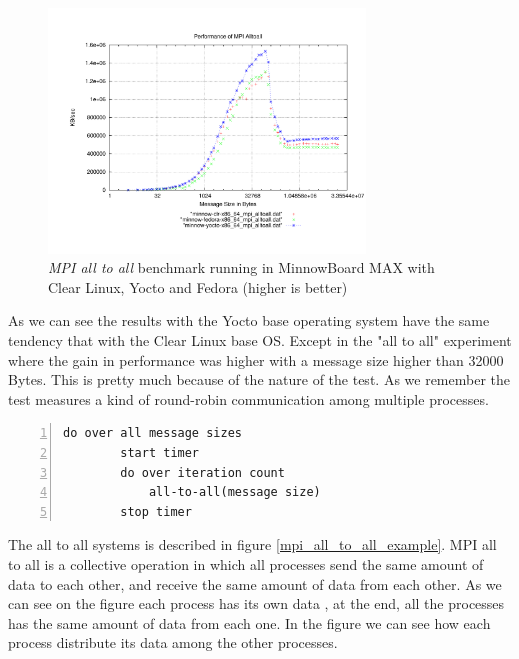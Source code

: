 \begin{figure}[H]
\centering
\includegraphics[width=0.75\textwidth]{images/mpbench_yocto_experiments/mpi_alltoall.pdf}
\caption{\textit{MPI all to all} benchmark running in  MinnowBoard MAX with Clear Linux, Yocto
and Fedora (higher is better)}
\label{mpi_all_to_all_yocto}
\end{figure}

As we can see the results with the Yocto base operating system have the same
tendency that with the Clear Linux base OS. Except in the "all to all"
experiment where the gain in performance was higher with a message size higher
than 32000 Bytes. This is pretty much because of the nature of the test. As we
remember the test measures a kind of round-robin communication among multiple
processes.

\begin{minipage}{\textwidth}
\end{minipage}

\begin{minipage}{\textwidth}
\begin{lstlisting}[frame=single,numbers=left]
    do over all message sizes 
        start timer
        do over iteration count 
            all-to-all(message size)
        stop timer
\end{lstlisting}

\end{minipage}

The all to all systems is described in figure \ref{mpi_all_to_all_example}.
MPI all to all  is a collective operation in which all processes send the same
amount of data to each other, and receive the same amount of data from each
other. As we can see on the figure each process has its own data , at the end,
all the processes has the same amount of data from each one. In the figure we
can see how each process distribute its data among the other processes.

